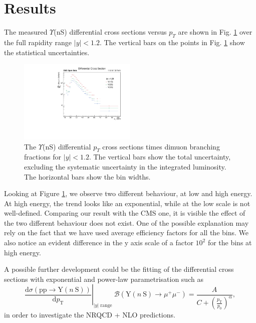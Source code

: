 \documentclass[a4paper,11pt]{article}
\begin{document}
\section{Results}
The measured $\Upsilon$(nS) differential cross sections versus $p_T$ are shown in Fig. \ref{fig:diffcrosssec} over the full rapidity range $|y| < 1.2$. The vertical bars on the points in Fig. \ref{fig:diffcrosssec} show the statistical uncertainties.
\begin{figure}[h]
    \centering
    \includegraphics[width=0.5\textwidth]{diffCrossSection.pdf}
    \caption{The $\Upsilon$(nS) differential $p_T$ cross sections times dimuon branching fractions for $|y| < 1.2$. The vertical bars show the total uncertainty, excluding the systematic uncertainty in the integrated luminosity. The horizontal bars show the bin widths.}
    \label{fig:diffcrosssec}
\end{figure}

Looking at Figure \ref{fig:diffcrosssec}, we observe two different behaviour, at low and high energy. At high energy, the trend looks like an exponential, while at the low scale is not well-defined. 
Comparing our result with the CMS one\cite{Khachatryan_2015}, it is visible the effect of the two different behaviour does not exist. One of the possible explanation may rely on the fact that we have used average efficiency factors for all the bins.
We also notice an evident difference in the y axis scale of a factor $10^2$ for the bins at high energy. 

A possible further development could be the fitting of the differential cross sections with exponential and power-law parametrisation such as
\begin{equation}
    \left.\frac{\mathrm{d} \sigma(\mathrm{pp} \rightarrow \mathrm{Y}(n \mathrm{~S}))}{\mathrm{d} p_{\mathrm{T}}}\right|_{|y| \text { range }} \mathcal{B}\left(\mathrm{Y}(n \mathrm{~S}) \rightarrow \mu^{+} \mu^{-}\right)=\frac{A}{C+\left(\frac{p_{\mathrm{T}}}{p_0}\right)^\alpha},
\end{equation}
in order to investigate the NRQCD + NLO predictions.
\end{document}
